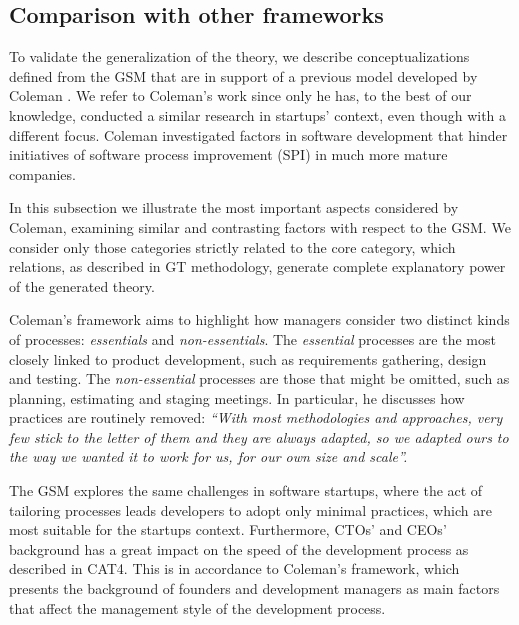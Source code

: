\documentclass[10pt,journal,letterpaper,compsoc]{IEEEtran}
\begin{document}
\subsection{Comparison with other frameworks}
\label{sect:theory:validation:others}

To validate the generalization of the theory, we describe conceptualizations 
defined from the GSM that are in support of a previous model developed by 
Coleman \cite{Coleman2007,Coleman2008a, Coleman2008}. We refer to Coleman's work 
since only he has, to the best of our knowledge, conducted a similar research in 
startups' context, even though with a different focus. Coleman investigated 
factors in software development that hinder initiatives of software process 
improvement (SPI) in much more mature companies. %

In this subsection we illustrate the most important aspects considered by 
Coleman, examining similar and contrasting factors with respect to the GSM. We 
consider only those categories strictly related to the core category, which 
relations, as described in GT methodology, generate complete explanatory power 
of the generated theory. 

Coleman's framework aims to highlight how managers consider two distinct kinds 
of processes: \textit{essentials} and \textit{non-essentials}. The 
\textit{essential} processes are the most closely linked to product development, 
such as requirements gathering, design and testing. The \textit{non-essential} 
processes are those that might be omitted, such as planning, estimating and 
staging meetings. In particular, he discusses how practices are routinely 
removed: \textit{``With most methodologies and approaches, very few stick to the 
letter of them and they are always adapted, so we adapted ours to the way we 
wanted it to work for us, for our own size and scale''.} %

The GSM explores the same challenges in software startups, where the act of 
tailoring processes leads developers to adopt only minimal practices, which are 
most suitable for the startups context. Furthermore, CTOs' and CEOs' background 
has a great impact on the speed of the development process as described in CAT4. 
This is in accordance to Coleman's framework, which presents the background of 
founders and development managers as main factors that affect the management 
style of the development process.
\end{document}
